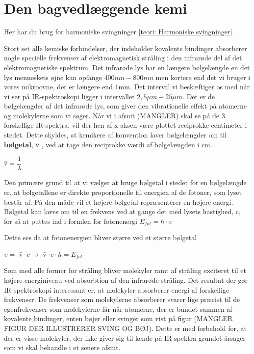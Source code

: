 \section{Den bagvedlæggende kemi}

Her har du brug for harmoniske svingninger \ref{teori: Harmoniske svingninger}

Stort set alle kemiske forbindelser, der indeholder kovalente bindinger absorberer nogle specielle frekvenser af elektromagnetisk stråling i den infrarøde del af det elektromagnetiske spektrum. Det infrarøde lys har en længere bølgelængde en det lys menneskets øjne kan opfange $400nm - 800nm$ men kortere end det vi bruger i vores mikroovne, der er længere end 1mm. Det interval vi beskæftiger os med når vi ser på IR-spektroskopi ligger i intervallet $2,5 \mu m- 25 \mu m $. Det er de bølgelængder af det infrarøde lys, som giver den vibrationelle effekt på atomerne og molekylerne som vi søger. Når vi i afsnit (MANGLER) skal se på de 3 forskellige IR-spektra, vil der hen af x-aksen være plottet reciprokke centimeter i stedet. Dette skyldes, at kemikere af konvention laver bølgelængder om til \textbf{bølgetal}, \={v} , ved at tage den reciprokke værdi af bølgelængden i cm. 

\begin{center}
\={v}$= \dfrac{1}{\lambda}$
\end{center}

Den primære grund til at vi vælger at bruge bølgetal i stedet for en bølgelængde er, at bølgetallene er direkte proportionelle til energien af de fotoner, som lyset består af. På den måde vil et højere bølgetal repræsenterer en højere energi. Bølgetal kan laves om til en frekvens ved at gange det med lysets hastighed, c, for så at puttes ind i formlen for fotonenergi $E_{fot} = h \cdot \upsilon$

Dette ses da at fotonenergien bliver større ved et større bølgetal 
\\

\begin{center}
$\upsilon =$ \={v} $\cdot c \rightarrow$ \={v} $\cdot c \cdot h = E_{fot}$
\end{center}

Som med alle former for stråling bliver molekyler ramt af stråling exciteret til et højere energiniveau ved absorbtion af den infrarøde stråling. Det resultat der gør IR-spektroskopi interessant er, at molekyler absorberer energi af forskellige frekvenser. De frekvenser som molekylerne absorberer svarer lige præcist til de egenfrekvenser som molekylerne får når atomerne, der er bundet sammen af  kovalente bindinger, enten bøjer eller svinger som vist på figur (MANGLER FIGUR DER ILLUSTRERER SVING OG BØJ). Dette er med forbehold for, at der er visse molekyler, der ikke giver sig til kende på IR-spektra grundet årsager som vi skal behandle i et senere afsnit. 
\\

